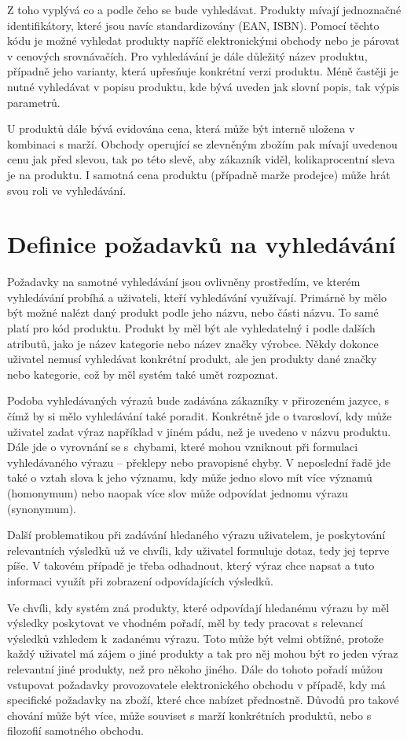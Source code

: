 \documentclass[FM,DP]{tulthesis}
\begin{document}
Z toho vyplývá co a podle čeho se bude vyhledávat. Produkty mívají jednoznačné identifikátory, 
které jsou navíc standardizovány (EAN, ISBN). Pomocí těchto kódu je možné vyhledat produkty
napříč elektronickými obchody nebo je párovat v cenových srovnávačích. Pro vyhledávání
je dále důležitý název produktu, případně jeho varianty, která upřesňuje konkrétní
verzi produktu. Méně častěji je nutné vyhledávat v popisu produktu, kde bývá uveden
jak slovní popis, tak výpis parametrů. 

U produktů dále bývá evidována cena, která může být interně uložena v kombinaci s marží.
Obchody operující se zlevněným zbožím pak mívají uvedenou cenu jak před slevou, tak po této
slevě, aby zákazník viděl, kolikaprocentní sleva je na produktu. I samotná cena produktu
(případně marže prodejce) může hrát svou roli ve vyhledávání.

\section{Definice požadavků na vyhledávání}

Požadavky na samotné vyhledávání jsou ovlivněny prostředím, ve kterém vyhledávání
probíhá a uživateli, kteří vyhledávání využívají. Primárně by mělo být možné
nalézt daný produkt podle jeho názvu, nebo části názvu. To samé platí pro 
kód produktu. Produkt by měl být ale vyhledatelný i podle dalších atributů, 
jako je název kategorie nebo název značky výrobce. Někdy dokonce uživatel nemusí
vyhledávat konkrétní produkt, ale jen produkty dané značky nebo kategorie, což by
měl systém také umět rozpoznat.

Podoba vyhledávaných výrazů bude zadávána zákazníky v přirozeném jazyce, s čímž by si mělo
vyhledávání také poradit. Konkrétně jde o tvarosloví, kdy může uživatel zadat výraz
například v jiném pádu, než je uvedeno v názvu produktu. Dále jde o vyrovnání se
s~chybami, které mohou vzniknout při formulaci vyhledávaného výrazu -- překlepy nebo
pravopisné chyby. V neposlední řadě jde také o vztah slova k jeho významu, kdy může
jedno slovo mít více významů (homonymum) nebo naopak více slov může odpovídat jednomu výrazu
(synonymum).

Další problematikou při zadávání hledaného výrazu uživatelem, je poskytování relevantních výsledků
už ve chvíli, kdy uživatel formuluje dotaz, tedy jej teprve píše. V takovém případě je třeba
odhadnout, který výraz chce napsat a tuto informaci využít při zobrazení odpovídajících
výsledků.

Ve chvíli, kdy systém zná produkty, které odpovídají hledanému výrazu by měl
výsledky poskytovat ve vhodném pořadí, měl by tedy pracovat s relevancí výsledků vzhledem 
k~zadanému výrazu. Toto může být velmi obtížné, protože každý uživatel má zájem o jiné
produkty a tak pro něj mohou být ro jeden výraz relevantní jiné produkty, než pro někoho
jiného. Dále do tohoto pořadí můžou vstupovat požadavky provozovatele elektronického obchodu
v případě, kdy má specifické požadavky na zboží, které chce nabízet přednostně. Důvodů
pro takové chování může být více, může souviset s marží konkrétních produktů, 
nebo s filozofií samotného obchodu.
\end{document}
